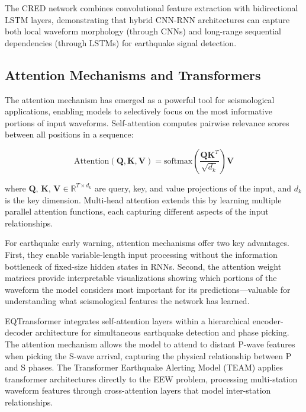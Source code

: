 \documentclass[review,authoryear]{elsarticle}
\begin{document}
The CRED network \citep{mousavi2019cred} combines convolutional feature extraction with bidirectional LSTM layers, demonstrating that hybrid CNN-RNN architectures can capture both local waveform morphology (through CNNs) and long-range sequential dependencies (through LSTMs) for earthquake signal detection.

\subsection{Attention Mechanisms and Transformers}

The attention mechanism \citep{bahdanau2015attention, vaswani2017attention} has emerged as a powerful tool for seismological applications, enabling models to selectively focus on the most informative portions of input waveforms. Self-attention computes pairwise relevance scores between all positions in a sequence:

\begin{equation}
\text{Attention}(\mathbf{Q}, \mathbf{K}, \mathbf{V}) = \text{softmax}\left(\frac{\mathbf{Q}\mathbf{K}^T}{\sqrt{d_k}}\right)\mathbf{V}
\label{eq:attention}
\end{equation}

\noindent where $\mathbf{Q}$, $\mathbf{K}$, $\mathbf{V} \in \mathbb{R}^{T \times d_k}$ are query, key, and value projections of the input, and $d_k$ is the key dimension. Multi-head attention extends this by learning multiple parallel attention functions, each capturing different aspects of the input relationships.

For earthquake early warning, attention mechanisms offer two key advantages. First, they enable variable-length input processing without the information bottleneck of fixed-size hidden states in RNNs. Second, the attention weight matrices provide interpretable visualizations showing which portions of the waveform the model considers most important for its predictions---valuable for understanding what seismological features the network has learned.

EQTransformer \citep{mousavi2020earthquake} integrates self-attention layers within a hierarchical encoder-decoder architecture for simultaneous earthquake detection and phase picking. The attention mechanism allows the model to attend to distant P-wave features when picking the S-wave arrival, capturing the physical relationship between P and S phases. The Transformer Earthquake Alerting Model (TEAM) \citep{munchmeyer2021team} applies transformer architectures directly to the EEW problem, processing multi-station waveform features through cross-attention layers that model inter-station relationships.
\end{document}
